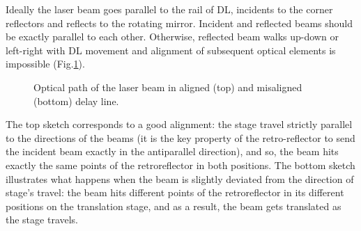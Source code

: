 \documentclass[14pt,a4paper] {article}
\begin{document}
Ideally the laser beam goes parallel to the rail of DL, incidents to the corner reflectors and reflects to the rotating mirror. Incident and reflected beams should be exactly parallel to each other. Otherwise, reflected beam walks up-down or left-right with DL movement and alignment of subsequent optical elements is impossible (Fig.\ref{fig:DL_sketch}).

\begin{figure}
\caption{Optical path of the laser beam in aligned (top) and misaligned (bottom) delay line.}
\label{fig:DL_sketch} 
\end{figure}

The top sketch corresponds to a good alignment: the stage travel strictly parallel to the directions of the beams (it is the key property of the retro-reflector to send the incident beam exactly in the antiparallel direction), and so, the beam hits exactly the same points of the retroreflector in both positions.
The bottom sketch illustrates what happens when the beam is slightly deviated from the direction of stage’s travel: the beam hits different points of the retroreflector in its different positions on the translation stage, and as a result, the beam gets translated as the stage travels.
   
\end{document}
